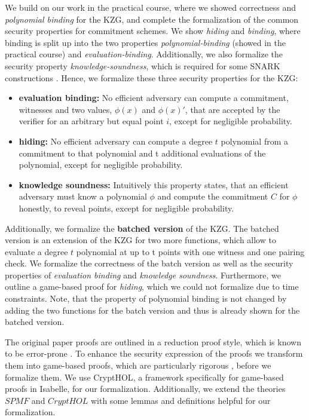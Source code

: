 We build on our work in the practical course, where we showed correctness and \textit{polynomial binding} for the KZG, and complete the formalization of the common security properties for commitment schemes. We show \textit{hiding} and \textit{binding}, where binding is split up into the two properties \textit{polynomial-binding} (showed in the practical course) and \textit{evaluation-binding}. Additionally, we also formalize the security property \textit{knowledge-soundness}, which is required for some SNARK constructions \parencite*{sonic,plonk}. Hence, we formalize these three security properties  for the KZG:
\begin{itemize}
    \item \textbf{evaluation binding:}
    No efficient adversary can compute a commitment, witnesses and two values, $\phi(x)$ and $\phi(x)'$, that are accepted by the verifier for an arbitrary but equal point $i$, except for negligible probability.
    \item \textbf{hiding:}
    No efficient adversary can compute a degree $t$ polynomial from a commitment to that polynomial and t additional evaluations of the polynomial, except for negligible probability.
    \item \textbf{knowledge soundness:}
    Intuitively this property states, that an efficient adversary must know a polynomial $\phi$ and compute the commitment $C$ for $\phi$ honestly, to reveal points, except for negligible probability. 
\end{itemize} 
Additionally, we formalize the \textbf{batched version} of the KZG\parencite*{KZG}. The batched version is an extension of the KZG for two more functions, which allow to evaluate a degree $t$ polynomial at up to t points with one witness and one pairing check. We formalize the correctness of the batch version as well as the security properties of \textit{evaluation binding} and \textit{knowledge soundness}. Furthermore, we outline a game-based proof for \textit{hiding}, which we could not formalize due to time constraints. Note, that the property of polynomial binding is not changed by adding the two functions for the batch version and thus is already shown for the batched version. 

The original paper proofs are outlined in a reduction proof style, which is known to be error-prone \parencite{gamesB&R}. To enhance the security expression of the proofs we transform them into game-based proofs, which are particularly rigorous \parencite{shoup_games, gamesB&R}, before we formalize them. We use CryptHOL\parencite*{CryptHOL-AFP}, a framework specifically for game-based proofs in Isabelle, for our formalization. 
Additionally, we extend the theories $SPMF$ and $CryptHOL$ with some lemmas and definitions helpful for our formalization.
